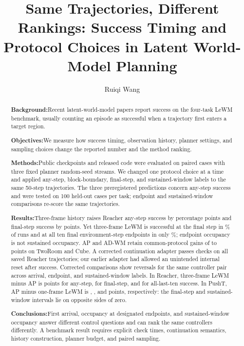 \documentclass[manuscript,screen,review]{jair}
\begin{document}
\title[Same Trajectories, Different Rankings]{Same Trajectories, Different Rankings: Success Timing and Protocol Choices in Latent World-Model Planning}
\author{Ruiqi Wang}
\renewcommand{\shortauthors}{Wang}

\begin{abstract}
\textbf{Background:}\quad  Recent latent-world-model papers report success on the four-task LeWM benchmark, usually counting an episode as successful when a trajectory first enters a target region.\par\noindent\textbf{Objectives:}\quad  We measure how success timing, observation history, planner settings, and sampling choices change the reported number and the method ranking.\par\noindent\textbf{Methods:}\quad  Public checkpoints and released code were evaluated on paired cases with three fixed planner random-seed streams. We changed one protocol choice at a time and applied any-step, block-boundary, final-step, and sustained-window labels to the same 50-step trajectories. The three preregistered predictions concern any-step success and were tested on 100 held-out cases per task; endpoint and sustained-window comparisons re-score the same trajectories.\par\noindent\textbf{Results:}\quad Three-frame history raises Reacher any-step success by \ReacherHistoryDeltaRevision{} percentage points and final-step success by \ReacherHistoryFinalCI{} points. Yet three-frame LeWM is successful at the final step in \ReacherLeWMThreeFinal\% of runs and at all ten final environment-step endpoints in only \RfourReacherThreeAllTen\%; endpoint occupancy is not sustained occupancy. AP and AD-WM retain common-protocol gains of \TwoRoomADGain{} to \CubeAPGain{} points on TwoRoom and Cube. A corrected continuation adapter passes checks on all \RfourFormalCount{} saved Reacher trajectories; our earlier adapter had allowed an unintended internal reset after success. Corrected comparisons show reversals for the same controller pair across arrival, endpoint, and sustained-window labels. In Reacher, three-frame LeWM minus AP is \RfourReacherThreeAPAny{} points for any-step, \RfourReacherThreeAPFinal{} for final-step, and \RfiveReacherThreeAPAllTen{} for all-last-ten success. In PushT, AP minus one-frame LeWM is \APLeWMPushTAnyCI{}, \APLeWMPushTFinalCI{}, and \RfourWindowSix{} points, respectively: the final-step and sustained-window intervals lie on opposite sides of zero.\par\noindent\textbf{Conclusions:}\quad First arrival, occupancy at designated endpoints, and sustained-window occupancy answer different control questions and can rank the same controllers differently. A benchmark result requires explicit check times, continuation semantics, history construction, planner budget, and paired sampling.

\end{abstract}
\end{document}

